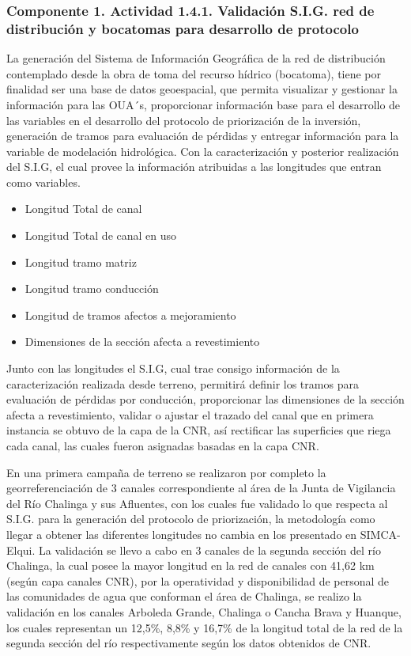 \documentclass[]{article}
\begin{document}
\subsubsection{Componente 1. Actividad 1.4.1. Validación S.I.G. red de distribución y bocatomas para desarrollo de protocolo}

La generación del Sistema de Información Geográfica de la red de distribución contemplado desde la obra de toma del recurso hídrico (bocatoma), tiene por finalidad ser una base de datos geoespacial, que permita visualizar y gestionar la información para las OUA´s, proporcionar información base para el desarrollo de las variables en el desarrollo del protocolo de priorización de la inversión, generación de tramos para evaluación de pérdidas y  entregar información para la variable de modelación hidrológica. Con la caracterización y posterior realización del S.I.G, el cual provee la información atribuidas a las longitudes que entran como variables.
 
 \begin{itemize}
 \item  Longitud Total de canal
 \item  Longitud Total de canal en uso
 \item Longitud tramo matriz
 \item Longitud tramo conducción
 \item Longitud de tramos afectos a mejoramiento
 \item Dimensiones de la sección afecta a revestimiento
 
 \end{itemize}

Junto con las longitudes el S.I.G, cual trae consigo información de la caracterización realizada desde terreno, permitirá definir los tramos para evaluación de pérdidas por conducción, proporcionar las dimensiones de la sección afecta a revestimiento, validar o ajustar el trazado del canal que en primera instancia se obtuvo de la capa de la CNR, así rectificar las superficies que riega cada canal, las cuales fueron asignadas basadas en la capa CNR. 

En una primera campaña de terreno se realizaron por completo la georreferenciación de 3 canales correspondiente al área de la Junta de Vigilancia del Río Chalinga y sus Afluentes, con los cuales fue validado lo que respecta al S.I.G. para la generación del protocolo de priorización, la metodología como llegar a obtener las diferentes longitudes no cambia en los presentado en SIMCA-Elqui. La validación se llevo a cabo en 3 canales de la segunda sección del río Chalinga, la cual posee la mayor longitud en la red de canales con 41,62 km (según capa canales CNR), por la operatividad y disponibilidad de personal de las comunidades de agua que conforman el área de Chalinga, se realizo la validación en los canales Arboleda Grande, Chalinga o Cancha Brava y Huanque, los cuales representan un 12,5\%, 8,8\% y 16,7\% de la longitud total de la red de la segunda sección del río respectivamente según los datos obtenidos de CNR.
\end{document}
